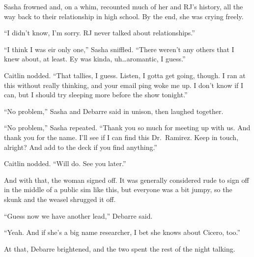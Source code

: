 Sasha frowned and, on a whim, recounted much of her and RJ's history, all the way back to their relationship in high school. By the end, she was crying freely.

``I didn't know, I'm sorry. RJ never talked about relationships.''

``I think I was eir only one,'' Sasha sniffled. ``There weren't any others that I knew about, at least. Ey was kinda, uh\ldots{}aromantic, I guess.''

Caitlin nodded. ``That tallies, I guess. Listen, I gotta get going, though. I ran at this without really thinking, and your email ping woke me up. I don't know if I can, but I should try sleeping more before the show tonight.''

``No problem,'' Sasha and Debarre said in unison, then laughed together.

``No problem,'' Sasha repeated. ``Thank you so much for meeting up with us. And thank you for the name. I'll see if I can find this Dr.~Ramirez. Keep in touch, alright? And add to the deck if you find anything.''

Caitlin nodded. ``Will do. See you later.''

And with that, the woman signed off. It was generally considered rude to sign off in the middle of a public sim like this, but everyone was a bit jumpy, so the skunk and the weasel shrugged it off.

``Guess now we have another lead,'' Debarre said.

``Yeah. And if she's a big name researcher, I bet she knows about Cicero, too.''

At that, Debarre brightened, and the two spent the rest of the night talking.
